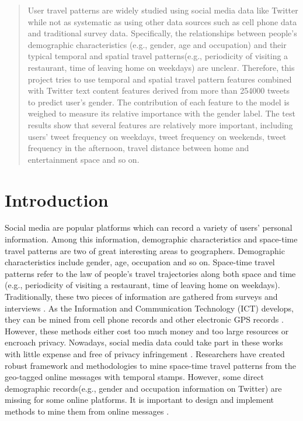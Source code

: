 \documentclass{article}
\begin{document}
\printAffiliationsAndNotice{\icmlEqualContribution} %

\begin{abstract} 

User travel patterns are widely studied using social media data like Twitter while not as systematic as using other data sources such as cell phone data and traditional survey data. Specifically, the relationships between people's demographic characteristics (e.g., gender, age and occupation) and their typical temporal and spatial travel patterns(e.g., periodicity of visiting a restaurant, time of leaving home on weekdays) are unclear. Therefore, this project tries to use temporal and spatial travel pattern features combined with Twitter text content features derived from more than 254000 tweets to predict user's gender. The contribution of each feature to the model is weighed to measure its relative importance with the gender label. The test results show that several features are relatively more important, including users' tweet frequency on weekdays, tweet frequency on weekends, tweet frequency in the afternoon, travel distance between home and entertainment space and so on. 

\end{abstract} 


\section{Introduction}

Social media are popular platforms which can record a variety of users' personal information. Among this information, demographic characteristics \cite{sloan2013knowing} and space-time travel patterns \cite{hasan2013understanding} are two of great interesting areas to geographers. Demographic characteristics include gender, age, occupation and so on. Space-time travel patterns refer to the law of people's travel trajectories along both space and time (e.g., periodicity of visiting a restaurant, time of leaving home on weekdays). Traditionally, these two pieces of information are gathered from surveys and interviews \cite{chen2011exploratory}. As the Information and Communication Technology (ICT) develops, they can be mined from cell phone records and other electronic GPS records \cite{sila2016analysis}. However, these methods either cost too much money and too large resources or encroach privacy. Nowadays, social media data could take part in these works with little expense and free of privacy infringement \cite{preoctiuc2013mining}. Researchers have created robust framework and methodologies to mine space-time travel patterns from the geo-tagged online messages with temporal stamps. However, some direct demographic records(e.g., gender and occupation information on Twitter) are missing for some online platforms. It is important to design and implement methods to mine them from online messages \cite{rao2011hierarchical}. 
\end{document}
